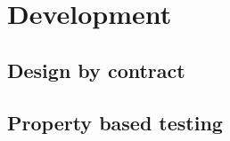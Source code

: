 
\chapter{Development} %

\label{Chapter 3} %

\section{Design by contract}

\section{Property based testing}

